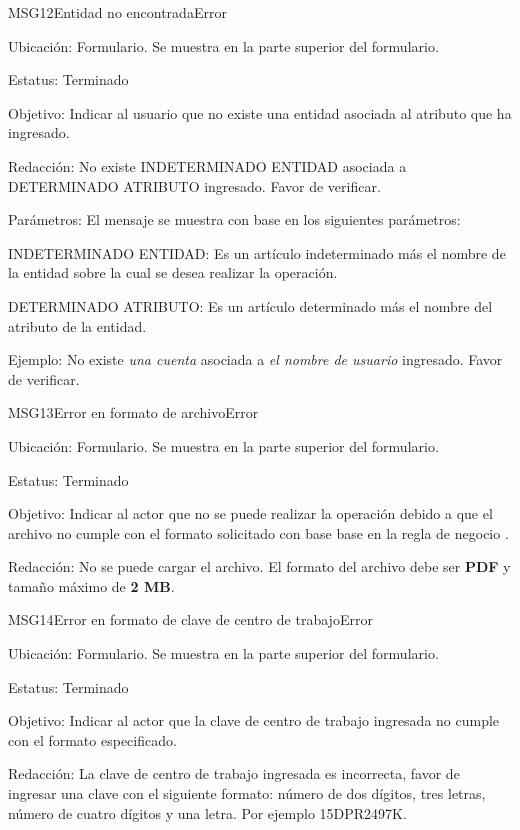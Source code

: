 \begin{mensaje}{MSG12}{Entidad no encontrada}{Error}
    \item[Ubicación:] Formulario. Se muestra en la parte superior del formulario.
    \item[Estatus:] Terminado
    \item[Objetivo:] Indicar al usuario que no existe una entidad asociada al atributo que ha ingresado.
    \item[Redacción:] No existe INDETERMINADO ENTIDAD asociada a DETERMINADO ATRIBUTO ingresado. Favor de verificar. 
    \item[Parámetros:] El mensaje se muestra con base en los siguientes parámetros:
    \begin{Citemize}
	    \item INDETERMINADO ENTIDAD: Es un artículo indeterminado más el nombre de la entidad sobre la cual se desea realizar la operación.
	    \item DETERMINADO ATRIBUTO: Es un artículo determinado más el nombre del atributo de la entidad.
    \end{Citemize}
    \item[Ejemplo:] No existe {\em una cuenta} asociada a {\em el nombre de usuario} ingresado. Favor de verificar.
    
\end{mensaje}

\begin{mensaje}{MSG13}{Error en formato de archivo}{Error} 
	\item[Ubicación:] Formulario. Se muestra en la parte superior del formulario.
	\item[Estatus:] Terminado
	\item[Objetivo:] Indicar al actor que no se puede realizar la operación debido a que el archivo no cumple con el formato solicitado con base base en la regla de negocio .
	\item[Redacción:] No se puede cargar el archivo. El formato del archivo debe ser \textbf{PDF} y tamaño máximo de \textbf{2 MB}.
\end{mensaje}


\begin{mensaje}{MSG14}{Error en formato de clave de centro de trabajo}{Error}
	\item[Ubicación:] Formulario. Se muestra en la parte superior del formulario.
	\item[Estatus:] Terminado
	\item[Objetivo:] Indicar al actor que la clave de centro de trabajo ingresada no cumple con el formato especificado.
	\item[Redacción:] La clave de centro de trabajo ingresada es incorrecta, favor de ingresar una clave con el siguiente formato: 
	    número de dos dígitos, tres letras, número de cuatro dígitos y una letra. Por ejemplo 15DPR2497K.
\end{mensaje}

